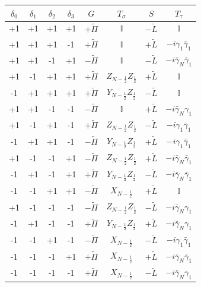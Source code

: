 \documentclass{article}
\begin{document}
{
    \centering
    \begin{tabular}{|c|c|c|c||c|c|c|c|} \hline
         $\delta_0$&$\delta_1$&$\delta_2$&$\delta_3$&$G$&$T_{\sigma}$&$S$&$T_{\tau}$  \\ \hline
         +1&+1&+1&+1&$+\tilde\Pi$&$\mathbb{I}$&$-\tilde L$&$\mathbb{I}$  \\
         +1&+1&+1&-1&$+\tilde\Pi$&$\mathbb{I}$&$+\tilde L$&$-i \gamma_1\bar{\gamma}_1$  \\ 
         +1&+1&-1&+1&$-\tilde\Pi$&$\mathbb{I}$&$-\tilde L$&$-i \bar{\gamma}_N\bar{\gamma}_1$  \\ 
         +1&-1&+1&+1&$+\tilde\Pi$&$Z_{N-\frac{1}{2}}Z_{\frac{1}{2}}$&$+\tilde L$&$\mathbb{I}$  \\ 
         -1&+1&+1&+1&$+\tilde\Pi$&$Y_{N-\frac{1}{2}}Z_{\frac{1}{2}}$&$-\tilde L$&$\mathbb{I}$  \\
         +1&+1&-1&-1&$-\tilde\Pi$&$\mathbb{I}$&$+\tilde L$&$-i \bar{\gamma}_N\gamma_1$  \\
         +1&-1&+1&-1&$+\tilde\Pi$&$Z_{N-\frac{1}{2}}Z_{\frac{1}{2}}$&$-\tilde L$&$-i \gamma_1\bar{\gamma}_1$ \\ 
         -1&+1&+1&-1&$-\tilde\Pi$&$Y_{N-\frac{1}{2}}Z_{\frac{1}{2}}$&$+\tilde L$&$-i \gamma_1\bar{\gamma}_1$  \\ 
         +1&-1&-1&+1&$-\tilde\Pi$&$Z_{N-\frac{1}{2}}Z_{\frac{1}{2}}$&$+\tilde L$&$-i \bar{\gamma}_N\bar{\gamma}_1$  \\ 
         -1&+1&-1&+1&$+\tilde\Pi$&$Y_{N-\frac{1}{2}}Z_{\frac{1}{2}}$&$-\tilde L$&$-i \bar{\gamma}_N\bar{\gamma}_1$  \\
         -1&-1&+1&+1&$-\tilde\Pi$&$X_{N-\frac{1}{2}}$&$+\tilde L$&$\mathbb{I}$  \\ 
         +1&-1&-1&-1&$-\tilde\Pi$&$Z_{N-\frac{1}{2}}Z_{\frac{1}{2}}$&$-\tilde L$&$-i \bar{\gamma}_N\gamma_1$  \\ 
         -1&+1&-1&-1&$+\tilde\Pi$&$Y_{N-\frac{1}{2}}Z_{\frac{1}{2}}$&$+\tilde L$&$-i \bar{\gamma}_N\gamma_1$  \\ 
         -1&-1&+1&-1&$-\tilde\Pi$&$X_{N-\frac{1}{2}}$&$-\tilde L$&$-i \gamma_1\bar{\gamma}_1$ \\ 
         -1&-1&-1&+1&$+\tilde\Pi$&$X_{N-\frac{1}{2}}$&$+\tilde L$&$-i \bar{\gamma}_N\bar{\gamma}_1$  \\ 
         -1&-1&-1&-1&$+\tilde\Pi$&$X_{N-\frac{1}{2}}$&$-\tilde L$&$-i \bar{\gamma}_N\gamma_1$  \\ \hline
    \end{tabular}
} 
\end{document}
